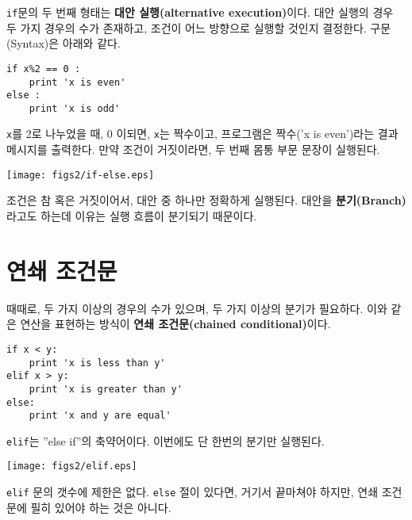 
{\tt if}문의 두 번째 형태는 {\bf 대안 실행(alternative execution)}이다.
대안 실행의 경우 두 가지 경우의 수가 존재하고, 조건이 어느 방향으로 실행할 것인지 결정한다. 
구문(Syntax)은 아래와 같다.

\beforeverb
\begin{verbatim}
if x%2 == 0 :
    print 'x is even'
else :
    print 'x is odd'
\end{verbatim}
\afterverb
%
{\tt x}를 2로 나누었을 때, 0 이되면, {\tt x}는 짝수이고, 프로그램은 짝수('x is even')라는 결과 메시지를 출력한다. 
만약 조건이 거짓이라면, 두 번째 몸통 부문 문장이 실행된다.

\beforefig
\centerline{\texttt{[image: figs2/if-else.eps]}}
\afterfig

조건은 참 혹은 거짓이어서, 대안 중 하나만 정확하게 실행된다. 
대안을 {\bf 분기(Branch)}라고도 하는데 이유는 실행 흐름이 분기되기 때문이다.


\section{연쇄 조건문}

때때로, 두 가지 이상의 경우의 수가 있으며, 두 가지 이상의 분기가 필요하다.
이와 같은 연산을 표현하는 방식이 {\bf 연쇄 조건문(chained conditional)}이다.

\beforeverb
\begin{verbatim}
if x < y:
    print 'x is less than y'
elif x > y:
    print 'x is greater than y'
else:
    print 'x and y are equal'
\end{verbatim}
\afterverb
%
{\tt elif}는 ''else if''의 축약어이다. 이번에도 단 한번의 분기만 실행된다.

\beforefig
\centerline{\texttt{[image: figs2/elif.eps]}}
\afterfig

{\tt elif} 문의 갯수에 제한은 없다. 
{\tt else} 절이 있다면, 거기서 끝마쳐야 하지만, 연쇄 조건문에 필히 있어야 하는 것은 아니다.


